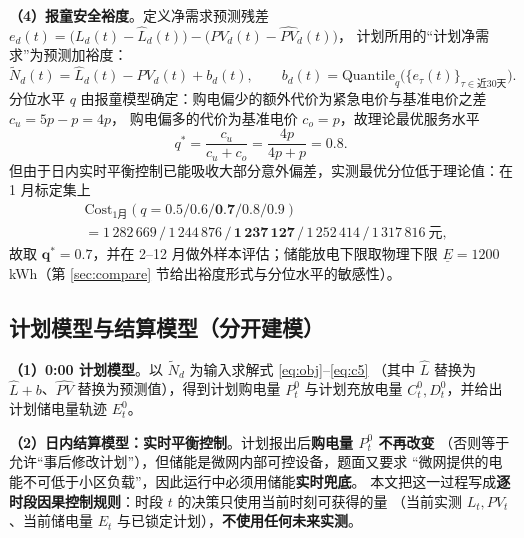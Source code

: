 \documentclass[12pt,a4paper,fontset=fandol]{ctexart}
\begin{document}
\textbf{（4\nobreak）报童安全裕度}\nobreak。定义净需求预测残差
$e_d(t)=\big(L_d(t)-\hat L_d(t)\big)-\big(PV_d(t)-\widehat{PV}_d(t)\big)$\nobreak，
计划所用的“计划净需求\nobreak”为预测加裕度\nobreak：
\begin{equation}
\tilde N_d(t)=\hat L_d(t)-\widehat{PV}_d(t)+b_d(t),\qquad
b_d(t)=\mathrm{Quantile}_{q}\big(\{e_\tau(t)\}_{\tau\in\text{近30天}}\big).
\label{eq:buffer}
\end{equation}
分位水平 $q$ 由报童模型\cite{newsboy}确定\nobreak：购电偏少的额外代价为紧急电价与基准电价之差 $c_u=5p-p=4p$\nobreak，
购电偏多的代价为基准电价 $c_o=p$\nobreak，故理论最优服务水平
\begin{equation}
q^*=\frac{c_u}{c_u+c_o}=\frac{4p}{4p+p}=0.8 .
\label{eq:newsboy}
\end{equation}
但由于日内实时平衡控制已能吸收大部分意外偏差\nobreak，实测最优分位低于理论值\nobreak：在 1 月标定集上
\begin{equation}
\begin{aligned}
&\mathrm{Cost}_{1\text{月}}(q=0.5/0.6/\textbf{0.7}/0.8/0.9)\\
&=1\,282\,669\,/\,1\,244\,876\,/\,\bm{1\,237\,127}\,/\,1\,252\,414\,/\,1\,317\,816\ \text{元},
\end{aligned}
\label{eq:qtune}
\end{equation}
故取 $\bm{q^*=0.7}$\nobreak，并在 2--12 月做外样本评估\nobreak；储能放电下限取物理下限
$\underline E=1200$ kWh（第 \ref{sec:compare} 节给出裕度形式与分位水平的敏感性\nobreak）\nobreak。

\subsection{计划模型与结算模型（分开建模\nobreak）}

\textbf{（1\nobreak）0:00 计划模型}\nobreak。以 $\tilde N_d$ 为输入求解式 \eqref{eq:obj}--\eqref{eq:c5}
（其中 $\hat L$ 替换为 $\hat L+b$\nobreak、$\widehat{PV}$ 替换为预测值\nobreak）\nobreak，得到计划购电量 $P^0_t$
与计划充放电量 $C^0_t,D^0_t$\nobreak，并给出计划储电量轨迹 $E^0_t$\nobreak。

\textbf{（2\nobreak）日内结算模型\nobreak：实时平衡控制}\nobreak。计划报出后\textbf{购电量 $P^0_t$ 不再改变}
（否则等于允许“事后修改计划\nobreak”\nobreak）\nobreak，但储能是微网内部可控设备\nobreak，题面又要求
“微网提供的电能不可低于小区负载\nobreak”\nobreak，因此运行中必须用储能\textbf{实时兜底}\nobreak。
本文把这一过程写成\textbf{逐时段因果控制规则}\nobreak：时段 $t$ 的决策只使用当前时刻可获得的量
（当前实测 $L_t,PV_t$\nobreak、当前储电量 $E_t$ 与已锁定计划\nobreak）\nobreak，\textbf{不使用任何未来实测}\nobreak。
\end{document}
